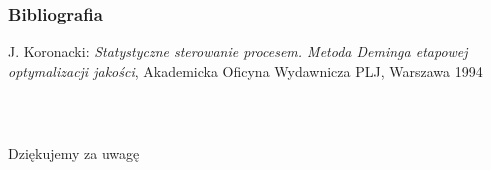 \documentclass[11pt,usenames,dvipsnames,svgnames,x11names]{beamer}
\theoremstyle{plain}
\theoremstyle{definition}
\theoremstyle{remark}
\begin{document}
\begin{frame}
\frametitle{Bibliografia}
\begin{thebibliography}{9}
 J. Koronacki: \emph{Statystyczne sterowanie procesem. Metoda Deminga etapowej optymalizacji jakości},  Akademicka Oficyna Wydawnicza PLJ, Warszawa 1994
\end{thebibliography}
\end{frame}


\begin{frame}  
\frametitle{~}
\begin{center}
\Large{Dziękujemy za uwagę}
\end{center}

\end{frame}
\end{document}
